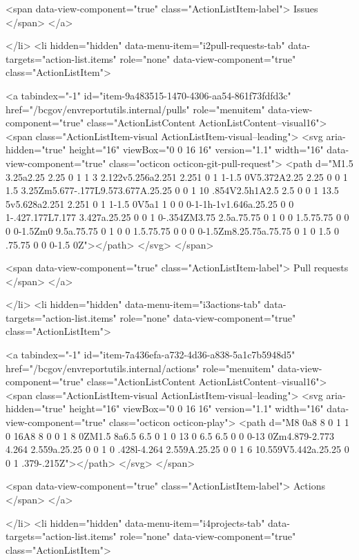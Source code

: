         <span data-view-component="true" class="ActionListItem-label">
          Issues
</span>      
</a>
  
</li>
        <li hidden="hidden" data-menu-item="i2pull-requests-tab" data-targets="action-list.items" role="none" data-view-component="true" class="ActionListItem">
    
    
    <a tabindex="-1" id="item-9a483515-1470-4306-aa54-861f73fdfd3c" href="/bcgov/envreportutils.internal/pulls" role="menuitem" data-view-component="true" class="ActionListContent ActionListContent--visual16">
        <span class="ActionListItem-visual ActionListItem-visual--leading">
          <svg aria-hidden="true" height="16" viewBox="0 0 16 16" version="1.1" width="16" data-view-component="true" class="octicon octicon-git-pull-request">
    <path d="M1.5 3.25a2.25 2.25 0 1 1 3 2.122v5.256a2.251 2.251 0 1 1-1.5 0V5.372A2.25 2.25 0 0 1 1.5 3.25Zm5.677-.177L9.573.677A.25.25 0 0 1 10 .854V2.5h1A2.5 2.5 0 0 1 13.5 5v5.628a2.251 2.251 0 1 1-1.5 0V5a1 1 0 0 0-1-1h-1v1.646a.25.25 0 0 1-.427.177L7.177 3.427a.25.25 0 0 1 0-.354ZM3.75 2.5a.75.75 0 1 0 0 1.5.75.75 0 0 0 0-1.5Zm0 9.5a.75.75 0 1 0 0 1.5.75.75 0 0 0 0-1.5Zm8.25.75a.75.75 0 1 0 1.5 0 .75.75 0 0 0-1.5 0Z"></path>
</svg>
        </span>
      
        <span data-view-component="true" class="ActionListItem-label">
          Pull requests
</span>      
</a>
  
</li>
        <li hidden="hidden" data-menu-item="i3actions-tab" data-targets="action-list.items" role="none" data-view-component="true" class="ActionListItem">
    
    
    <a tabindex="-1" id="item-7a436efa-a732-4d36-a838-5a1c7b5948d5" href="/bcgov/envreportutils.internal/actions" role="menuitem" data-view-component="true" class="ActionListContent ActionListContent--visual16">
        <span class="ActionListItem-visual ActionListItem-visual--leading">
          <svg aria-hidden="true" height="16" viewBox="0 0 16 16" version="1.1" width="16" data-view-component="true" class="octicon octicon-play">
    <path d="M8 0a8 8 0 1 1 0 16A8 8 0 0 1 8 0ZM1.5 8a6.5 6.5 0 1 0 13 0 6.5 6.5 0 0 0-13 0Zm4.879-2.773 4.264 2.559a.25.25 0 0 1 0 .428l-4.264 2.559A.25.25 0 0 1 6 10.559V5.442a.25.25 0 0 1 .379-.215Z"></path>
</svg>
        </span>
      
        <span data-view-component="true" class="ActionListItem-label">
          Actions
</span>      
</a>
  
</li>
        <li hidden="hidden" data-menu-item="i4projects-tab" data-targets="action-list.items" role="none" data-view-component="true" class="ActionListItem">
    

